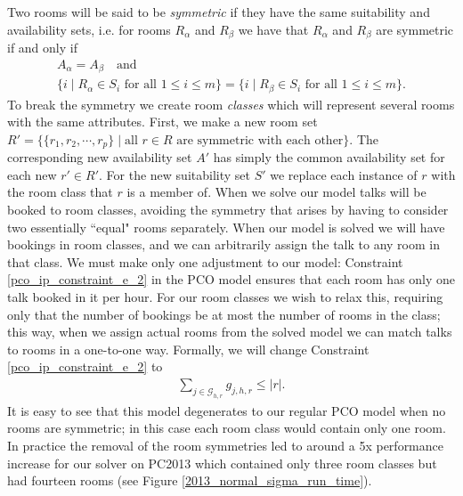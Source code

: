 \documentclass{svjour3}                     %
\begin{document}
Two rooms will be said to be \emph{symmetric} if they have the same suitability and availability sets, i.e. for rooms $R_\alpha$ and $R_\beta$ we have that $R_\alpha$ and $R_\beta$ are symmetric if and only if
\begin{gather*}
	A_\alpha = A_\beta \quad \text{and} \\
	\{i \; | \; R_\alpha \in S_i \text{ for all } 1 \le i \le m\} = \{i \; | \; R_\beta \in S_i \text{ for all } 1 \le i \le m\}.
\end{gather*}
To break the symmetry we create room \emph{classes} which will represent several rooms with the same attributes. First, we make a new room set $R' = \{ \{r_1, r_2, \cdots, r_p \} \; | \; \text{all } r \in R \text{ are symmetric with each other} \}$. The corresponding new availability set $A'$ has simply the common availability set for each new $r' \in R'$. For the new suitability set $S'$ we replace each instance of $r$ with the room class that $r$ is a member of. When we solve our model talks will be booked to room classes, avoiding the symmetry that arises by having to consider two essentially ``equal" rooms separately. When our model is solved we will have bookings in room classes, and we can arbitrarily assign the talk to any room in that class. We must make only one adjustment to our model: Constraint \ref{pco_ip_constraint_e_2} in the PCO model ensures that each room has only one talk booked in it per hour. For our room classes we wish to relax this, requiring only that the number of bookings be at most the number of rooms in the class; this way, when we assign actual rooms from the solved model we can match talks to rooms in a one-to-one way. Formally, we will change Constraint \ref{pco_ip_constraint_e_2} to
\begin{gather}
	\sum_{j \in \mathcal G_{h,r}} g_{j,h,r} \le |r|.
\end{gather}
It is easy to see that this model degenerates to our regular PCO model when no rooms are symmetric; in this case each room class would contain only one room. In practice the removal of the room symmetries led to around a 5x performance increase for our solver on PC2013 which contained only three room classes but had fourteen rooms (see Figure \ref{2013_normal_sigma_run_time}). 
\end{document}
